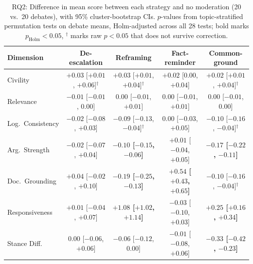 \begin{table}[htbp]
\centering
\caption[RQ2: each strategy vs.\ no moderation]{RQ2: Difference in mean score between each strategy and no moderation (20 vs.\ 20 debates), with 95\% cluster-bootstrap CIs. $p$-values from topic-stratified permutation tests on debate means, Holm-adjusted across all 28 tests; bold marks $p_{\text{Holm}} < 0.05$, $^{\dagger}$ marks raw $p < 0.05$ that does not survive correction.}
\label{tab:rq2-tests}
\scriptsize
\setlength{\tabcolsep}{3pt}
\begin{tabular}{l c c c c }
\toprule
\textbf{Dimension} & \textbf{De-escalation} & \textbf{Reframing} & \textbf{Fact-reminder} & \textbf{Common-ground} \\
\midrule
Civility & $+0.03$ [$+0.01$, $+0.06$]$^{\dagger}$ & $+0.03$ [$+0.01$, $+0.04$]$^{\dagger}$ & $+0.02$ [$0.00$, $+0.04$] & $+0.02$ [$+0.01$, $+0.04$]$^{\dagger}$ \\
Relevance & $-0.01$ [$-0.01$, $0.00$] & $0.00$ [$-0.01$, $+0.01$] & $0.00$ [$-0.01$, $+0.01$] & $0.00$ [$-0.01$, $0.00$] \\
Log.\ Consistency & $-0.02$ [$-0.08$, $+0.03$] & $-0.09$ [$-0.13$, $-0.04$]$^{\dagger}$ & $0.00$ [$-0.03$, $+0.05$] & $-0.10$ [$-0.16$, $-0.04$]$^{\dagger}$ \\
Arg.\ Strength & $-0.02$ [$-0.07$, $+0.04$] & {\bfseries\boldmath $-0.10$ [$-0.15$, $-0.06$]} & $+0.01$ [$-0.04$, $+0.05$] & {\bfseries\boldmath $-0.17$ [$-0.22$, $-0.11$]} \\
Doc.\ Grounding & $+0.04$ [$-0.02$, $+0.10$] & {\bfseries\boldmath $-0.19$ [$-0.25$, $-0.13$]} & {\bfseries\boldmath $+0.54$ [$+0.43$, $+0.65$]} & $-0.10$ [$-0.16$, $-0.04$]$^{\dagger}$ \\
Responsiveness & $+0.01$ [$-0.04$, $+0.07$] & {\bfseries\boldmath $+1.08$ [$+1.02$, $+1.14$]} & $-0.03$ [$-0.10$, $+0.03$] & {\bfseries\boldmath $+0.25$ [$+0.16$, $+0.34$]} \\
Stance Diff. & $0.00$ [$-0.06$, $+0.06$] & $-0.06$ [$-0.12$, $0.00$] & $-0.01$ [$-0.08$, $+0.06$] & {\bfseries\boldmath $-0.33$ [$-0.42$, $-0.23$]} \\
\bottomrule
\end{tabular}
\end{table}